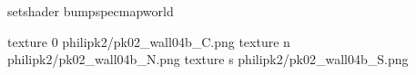setshader bumpspecmapworld

texture 0 philipk2/pk02_wall04b_C.png
texture n philipk2/pk02_wall04b_N.png
texture s philipk2/pk02_wall04b_S.png

